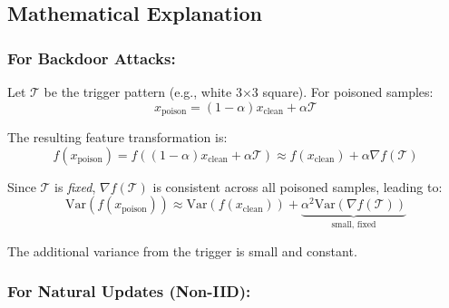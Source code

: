 \documentclass[11pt,a4paper]{article}
\begin{document}
\begin{center}
\end{center}

\subsection{Mathematical Explanation}

\subsubsection{For Backdoor Attacks:}

Let $\mathcal{T}$ be the trigger pattern (e.g., white 3×3 square). For poisoned samples:
\[
x_{\text{poison}} = (1-\alpha)x_{\text{clean}} + \alpha \mathcal{T}
\]

The resulting feature transformation is:
\[
f(x_{\text{poison}}) = f((1-\alpha)x_{\text{clean}} + \alpha \mathcal{T}) \approx f(x_{\text{clean}}) + \alpha \nabla f(\mathcal{T})
\]

Since $\mathcal{T}$ is \emph{fixed}, $\nabla f(\mathcal{T})$ is consistent across all poisoned samples, leading to:
\[
\text{Var}(f(x_{\text{poison}})) \approx \text{Var}(f(x_{\text{clean}})) + \underbrace{\alpha^2 \text{Var}(\nabla f(\mathcal{T}))}_{\text{small, fixed}}
\]

The additional variance from the trigger is small and constant.

\subsubsection{For Natural Updates (Non-IID):}
\end{document}
